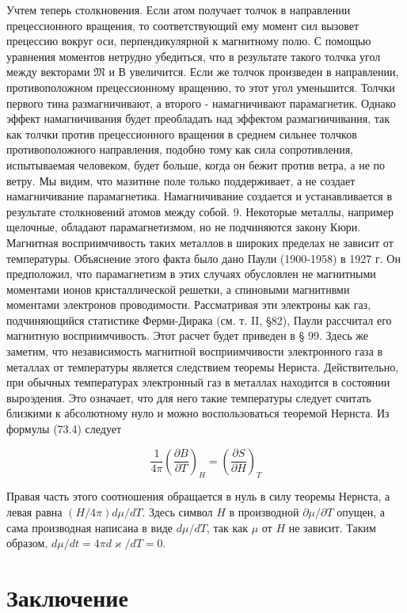 \documentclass[12pt]{article}
\begin{document}
  Учтем теперь столкновения. Если атом получает толчок в направлении прецессионного вращения, то соответствующий ему момент сил вызовет прецессию вокруг оси, перпендикулярной к магнитному полю. С помощью уравнения моментов нетрудно убедиться, что в результате такого толчка угол между векторами $\mathfrak{M}$ и В увеличится. Если же толчок произведен в направлении, противоположном прецессионному вращению, то этот угол уменьшится. Толчки первого тина размагничивают, а второго - намагничивают парамагнетик. Однако эффект намагничивания будет преобладать над эффектом размагничивания, так как толчки против прецессионного вращения в среднем сильнее толчков противоположного направления, подобно тому как сила сопротивления, испытываемая человеком, будет больше, когда он бежит против ветра, а не по ветру. Мы видим, что мазитнне поле только поддерживает, а не создает намагничивание парамагнетика. Намагничивание создается и устанавливается в результате столкновений атомов между собой.
  9. Некоторые металлы, например щелочные, обладают парамагнетизмом, но не подчиняются закону Кюри. Магнитная восприимчивость таких металлов в широких пределах не зависит от температуры. Объяснение этого факта было дано Паули (1900-1958) в 1927 г. Он предположил, что парамагнетизм в этих случаях обусловлен не магнитными моментами ионов кристаллической решетки, а спиновыми магнитнвми моментами электронов проводимости. Рассматривая эти электроны как газ, подчиняющийся статистике Ферми-Дирака (см. т. II, §82), Паули рассчитал его магнитную восприимчивость. Этот расчет будет приведен в § 99. Здесь же заметим, что независимость магнитной восприимчивости электронного газа в металлах от температуры является следствием теоремы Нериста. Действительно, при обычных температурах электронный газ в металлах находится в состоянии выроэдения. Это означает, что для него такие температуры следует считать близкими к абсолютному нуло и можно воспользоваться теоремой Нернста. Из формулы (73.4) следует

  $$
  \frac{1}{4 \pi}\left(\frac{\partial B}{\partial T}\right)_H=\left(\frac{\partial S}{\partial H}\right)_T
  $$


  Правая часть этого соотношения обращается в нуль в силу теоремы Нернста, а левая равна $(H / 4 \pi) d \mu / d T$. Здесь символ $H$ в производной $\partial \mu / \partial T$ опущен, а сама производная написана в виде $d \mu / d T$, так как $\mu$ от $H$ не зависит. Таким образом, $d \mu / d t=4 \pi d \varkappa / d T=0$.

  \section{Заключение}

  
  
\end{document}
